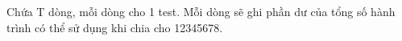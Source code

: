 Chứa T dòng, mỗi dòng cho 1 test. Mỗi dòng sẽ ghi phần dư của tổng số hành trình có thể sử dụng khi chia cho 12345678.